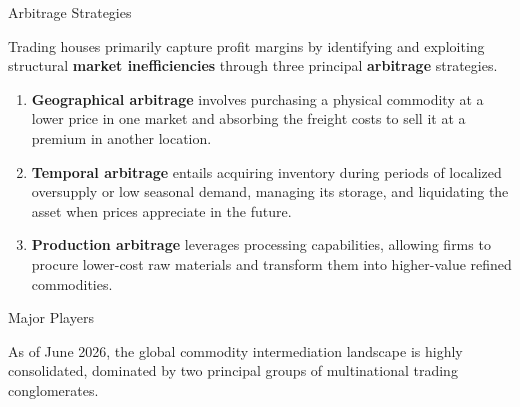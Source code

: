 \documentclass[10pt]{article}
\begin{document}
    \begin{core}{Arbitrage Strategies}

      Trading houses primarily capture profit margins by identifying and exploiting structural \textbf{market inefficiencies} through three principal \textbf{arbitrage} strategies. 

      \begin{enumerate}

        \item \textbf{Geographical arbitrage} involves purchasing a physical commodity at a lower price in one market and absorbing the freight costs to sell it at a premium in another location. 

        \item \textbf{Temporal arbitrage} entails acquiring inventory during periods of localized oversupply or low seasonal demand, managing its storage, and liquidating the asset when prices appreciate in the future. 

        \item \textbf{Production arbitrage} leverages processing capabilities, allowing firms to procure lower-cost raw materials and transform them into higher-value refined commodities.

      \end{enumerate}

    \end{core}

    \begin{core}{Major Players}

      As of June 2026, the global commodity intermediation landscape is highly consolidated, dominated by two principal groups of multinational trading conglomerates.


    \end{core}
\end{document}

